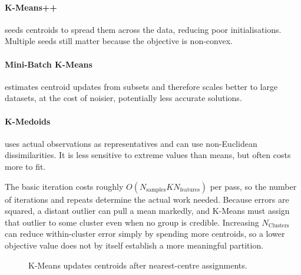 \paragraph{K-Means++} seeds centroids to spread them across the data, reducing poor initialisations.
Multiple seeds still matter because the objective is non-convex.
\paragraph{Mini-Batch K-Means} estimates centroid updates from subsets and therefore scales better to large datasets, at the cost of noisier, potentially less accurate solutions.
\paragraph{K-Medoids} uses actual observations as representatives and can use non-Euclidean dissimilarities.
It is less sensitive to extreme values than means, but often costs more to fit.

The basic iteration costs roughly $O(N_{\text{samples}}K N_{\text{features}})$ per pass, so the number of iterations and repeats determine the actual work needed.
Because errors are squared, a distant outlier can pull a mean markedly, and K-Means must assign that outlier to some cluster even when no group is credible.
Increasing $N_{\text{Clusters}}$ can reduce within-cluster error simply by spending more centroids, so a lower objective value does not by itself establish a more meaningful partition.


\begin{figure}[htbp]
    \centering
    \caption{K-Means updates centroids after nearest-centre assignments.}
    \label{fig:kmeans}
\end{figure}

